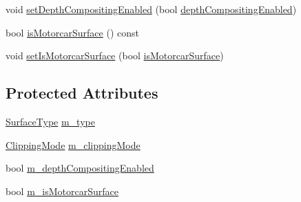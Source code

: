 \begin{DoxyCompactItemize}
\item 
void \hyperlink{classmotorcar_1_1WaylandSurface_a8c51a8593ec8aff7862fd0cf7a6dc3a3}{set\-Depth\-Compositing\-Enabled} (bool \hyperlink{classmotorcar_1_1WaylandSurface_a09cb70e037726ac4ee36c2aac9be30ae}{depth\-Compositing\-Enabled})
\item 
bool \hyperlink{classmotorcar_1_1WaylandSurface_a9d7e9cbd9424831e8152bf70d395e397}{is\-Motorcar\-Surface} () const 
\item 
void \hyperlink{classmotorcar_1_1WaylandSurface_afcb5b959953f55f477315ecb47dcf484}{set\-Is\-Motorcar\-Surface} (bool \hyperlink{classmotorcar_1_1WaylandSurface_a9d7e9cbd9424831e8152bf70d395e397}{is\-Motorcar\-Surface})
\end{DoxyCompactItemize}
\subsection*{Protected Attributes}
\begin{DoxyCompactItemize}
\item 
\hyperlink{classmotorcar_1_1WaylandSurface_a7715a41b6776800656722407ec01e0a5}{Surface\-Type} \hyperlink{classmotorcar_1_1WaylandSurface_a73fc5c245e98a08a551c7f412fd95966}{m\-\_\-type}
\item 
\hyperlink{classmotorcar_1_1WaylandSurface_ab48793c19a30e8ad689fb4465cd27a70}{Clipping\-Mode} \hyperlink{classmotorcar_1_1WaylandSurface_a17668113470d8907fa0c6ef84758f828}{m\-\_\-clipping\-Mode}
\item 
bool \hyperlink{classmotorcar_1_1WaylandSurface_ae3f67aa2ac9bf4d7ebf54ada6b9152d0}{m\-\_\-depth\-Compositing\-Enabled}
\item 
bool \hyperlink{classmotorcar_1_1WaylandSurface_a123a2705782ddf461ab615362dcaeb89}{m\-\_\-is\-Motorcar\-Surface}
\end{DoxyCompactItemize}


